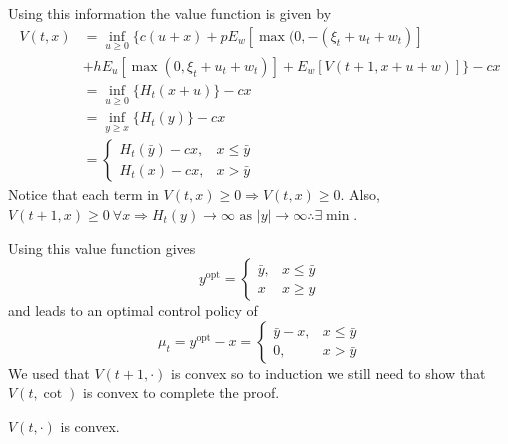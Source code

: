 \documentclass[lecture,12pt,]{pcms-l}
\theoremstyle{example}
\begin{document}
Using this information the value function is given by
\begin{align*}
V(t,x) &= \inf_{u\geq 0} \{c(u+x) + pE_w[\max(0,-(\xi_t+u_t+w_t)] \\
&+ hE_u[\max(0,\xi_t+u_t+w_t)] + E_w[V(t+1,x+u+w)]\} - cx \\
&= \inf_{u\geq 0} \{H_t(x+u)\} - cx \\
&= \inf_{y\geq x}\{H_t(y)\} - cx \\
&= \begin{cases} H_t(\bar{y})-cx, & x\leq\bar{y} \\ H_t(x)-cx, & x>\bar{y} \end{cases}
\end{align*}
Notice that each term in $V(t,x)\geq 0 \Rightarrow V(t,x)\geq 0$. Also, $V(t+1,x)\geq 0 ~\forall x \Rightarrow H_t(y)\to\infty \text{ as } |y|\to\infty \therefore \exists \min$.

Using this value function gives
$$y^{\text{opt}} = \begin{cases} \bar{y}, & x\leq\bar{y} \\ x & x\geq y \end{cases}$$
and leads to an optimal control policy of
$$\mu_t = y^{\text{opt}}-x = \begin{cases} \bar{y}-x, & x\leq\bar{y} \\ 0, & x>\bar{y} \end{cases}$$
We used that $V(t+1,\cdot)$ is convex  so to induction we still need to show that $V(t,\cot)$ is convex to complete the proof.

\begin{theorem}
$V(t,\cdot)$ is convex.
\end{theorem}
\end{document}
